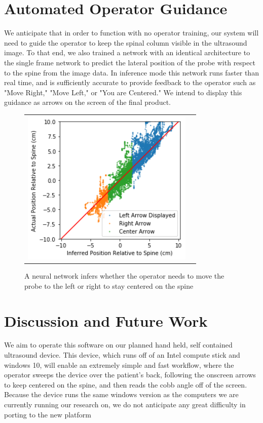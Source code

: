 \documentclass{article}
\begin{document}
\section{Automated Operator Guidance}
We anticipate that in order to function with no operator training, our system will need to guide the operator to keep the spinal column visible in the ultrasound image. To that end, we also trained a network with an identical architecture to the single frame network to predict the lateral position of the probe with respect to the spine from the image data. In inference mode this network runs faster than real time, and is sufficiently accurate to provide feedback to the operator such as "Move Right," "Move Left," or "You are Centered." We intend to display this guidance as arrows on the screen of the final product.

\begin{figure}
\centering
\begin{tabular}{cc}
\centering
\includegraphics[height=7.5cm,keepaspectratio]{Guidance}
\end{tabular}
\caption{A neural network infers whether the operator needs to move the probe to the left or right to stay centered on the spine
}
\end{figure}

\section{Discussion and Future Work}
We aim to operate this software on our planned hand held, self contained ultrasound device. This device, which runs off of an Intel compute stick and windows 10, will enable an extremely simple and fast workflow, where the operator sweeps the device over the patient’s back, following the onscreen arrows to keep centered on the spine, and then reads the cobb angle off of the screen. Because the device runs the same windows version as the computers we are currently running our research on, we do not anticipate any great difficulty in porting to the new platform
\end{document}
